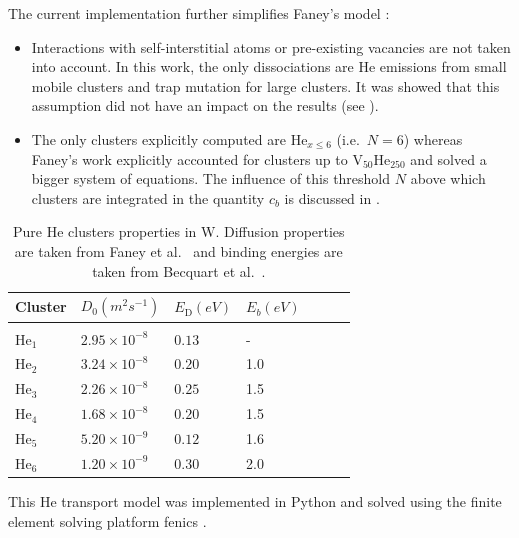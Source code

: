 The current implementation further simplifies Faney's model :
\begin{itemize}
    \item Interactions with \gls{self-interstitial} atoms or pre-existing vacancies are not taken into account.
    In this work, the only dissociations are He emissions from small mobile clusters and \gls{trap mutation} for large clusters.
    It was showed that this assumption did not have an impact on the results (see ).
    \item The only clusters explicitly computed are $\mathrm{He}_{x \leq 6}$ (i.e.\ $N=6$) whereas Faney's work explicitly accounted for clusters up to $\mathrm{V}_{50}\mathrm{He}_{250}$ and solved a bigger system of equations.
    The influence of this threshold $N$ above which clusters are integrated in the quantity $c_b$ is discussed in .
\end{itemize}

\begin{table}
    \centering
    \begin{tabular}{L{1cm} R{2cm} R{1.6cm} R{1.1cm} R{1.6cm} R{1.1cm} R{2cm}}
        Cluster & $D_0 (\si{m^2 s^{-1}})$  & $E_\mathrm{D} (\si{eV})$ &  $E_b (\si{eV})$   \\
        \hline
        \\
        He$_1$ & $2.95\times 10^{-8}$ & $0.13$ & - \\
        He$_2$ & $3.24\times 10^{-8}$ & $0.20$ & 1.0\\
        He$_3$ & $2.26\times 10^{-8}$ & $0.25$ & 1.5\\
        He$_4$ & $1.68\times 10^{-8}$ & $0.20$ & 1.5\\
        He$_5$ & $5.20\times 10^{-9}$ & $0.12$ & 1.6\\
        He$_6$ & $1.20\times 10^{-9}$ & $0.30$ & 2.0\\
    \end{tabular}
    \caption{Pure \gls{He} clusters properties in \gls{W}. Diffusion properties are taken from Faney et al.\ \cite{faney_spatially_2015} and binding energies are taken from Becquart et al.\ \cite{becquart_microstructural_2010}.}
\end{table}



This \gls{He} transport model was implemented in Python and solved using the finite element solving platform \gls{fenics} .
